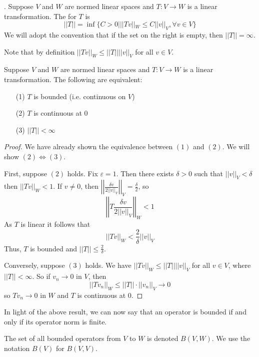 \begin{definition}.
    Suppose $V$ and $W$ are normed linear spaces and $T:V\rightarrow W$ is a linear transformation. The  for $T$ is $$||T|| = \inf\{C> 0|||Tv||_W \leq C||v||_V,\forall v \in V\}$$ We will adopt the convention that if the set on the right is empty, then $||T|| = \infty$. 
\end{definition}

Note that by definition $||Tv||_W \leq ||T||||v||_V$ for all $v \in V$.

\begin{proposition}
    Suppose $V$ and $W$ are normed linear spaces and $T:V\rightarrow W$ is a linear transformation. The following are equivalent: \begin{itemize}
        \item[(1)] $T$ is bounded (i.e. continuous on $V$) 
        \item[(2)] $T$ is continuous at $0$
        \item[(3)] $||T|| < \infty$
    \end{itemize}
\end{proposition}
\begin{proof}
    We have already shown the equivalence between $(1)$ and $(2)$. We will show $(2) \iff (3)$. 

    First, suppose $(2)$ holds. Fix $\varepsilon = 1$. Then there exists $\delta > 0$ such that $||v||_V < \delta$ then $||Tv||_W < 1$. If $v \neq 0$, then $\left|\left|\frac{\delta v}{2||v||_V}\right|\right|_V = \frac{\delta}{2}$, so $$\left|\left|T\frac{\delta v}{2||v||_V}\right|\right|_W < 1$$ As $T$ is linear it follows that $$||Tv||_W < \frac{2}{\delta}||v||_V$$ Thus, $T$ is bounded and $||T|| \leq \frac{2}{\delta}$.

    Conversely, suppose $(3)$ holds. We have $||Tv||_W \leq ||T||||v||_V$ for all $v \in V$, where $||T|| < \infty$. So if $v_n\rightarrow 0$ in $V$, then $$||Tv_n||_W \leq ||T||\cdot||v_n||_V\rightarrow 0$$ so $Tv_n\rightarrow 0$ in $W$ and $T$ is continuous at $0$.
\end{proof}

In light of the above result, we can now say that an operator is bounded if and only if its operator norm is finite.

\begin{definition}
    The set of all bounded operators from $V$ to $W$ is denoted $B(V,W)$. We use the notation $B(V)$ for $B(V,V)$.
\end{definition}

